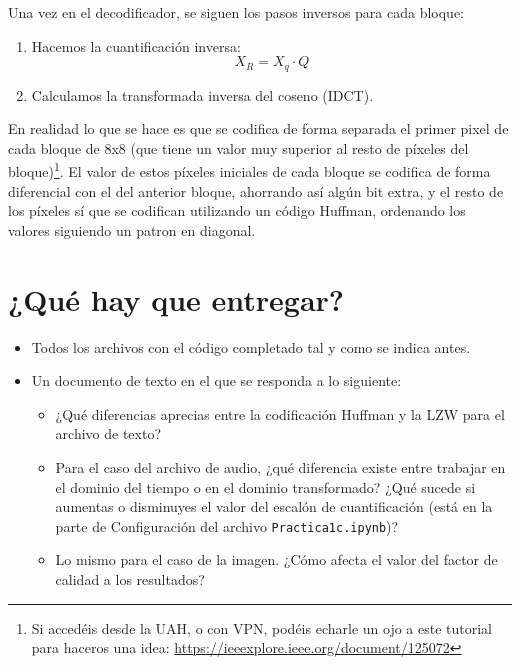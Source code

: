 \documentclass[es,practica]{uah}
\begin{document}
Una vez en el decodificador, se siguen los pasos inversos para cada bloque:

\begin{enumerate}
\item Hacemos la cuantificación inversa:
\begin{equation}
	X_R = X_q \cdot Q
\end{equation}
\item Calculamos la transformada inversa del coseno (IDCT).
\end{enumerate}


En realidad lo que se hace es que se codifica de forma separada el primer pixel de cada bloque de 8x8 (que tiene un valor muy superior al resto de píxeles del bloque)\footnote{Si accedéis desde la UAH, o con VPN, podéis echarle un ojo a este tutorial para haceros una idea: \url{https://ieeexplore.ieee.org/document/125072}}. El valor de estos píxeles iniciales de cada bloque se codifica de forma diferencial con el del anterior bloque, ahorrando así algún bit extra, y el resto de los píxeles sí que se codifican utilizando un código Huffman, ordenando los valores siguiendo un patron en diagonal.



\section{¿Qué hay que entregar?}

\begin{itemize}
	\item Todos los archivos con el código completado tal y como se indica antes. 
	\item Un documento de texto en el que se responda a lo siguiente:
	\begin{itemize}
		\item ¿Qué diferencias aprecias entre la codificación Huffman y la LZW para el archivo de texto?
		\item Para el caso del archivo de audio, ¿qué diferencia existe entre trabajar en el dominio del tiempo o en el dominio transformado? ¿Qué sucede si aumentas o disminuyes el valor del escalón de cuantificación (está en la parte de Configuración del archivo \texttt{Practica1c.ipynb})?
		\item Lo mismo para el caso de la imagen. ¿Cómo afecta el valor del factor de calidad a los resultados?
	\end{itemize}
\end{itemize}
\end{document}
